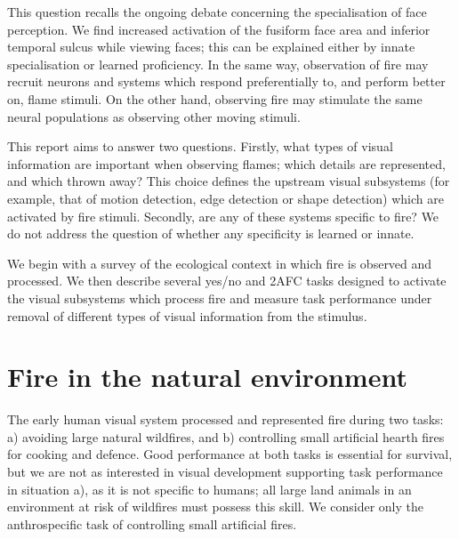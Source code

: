 \documentclass[a4paper]{article}
\begin{document}
This question recalls the ongoing debate concerning the specialisation of face perception. We find increased activation of the fusiform face area and inferior temporal sulcus while viewing faces\cite{allison2000social}; this can be explained either by innate specialisation or learned proficiency. In the same way, observation of fire may recruit neurons and systems which respond preferentially to, and perform better on, flame stimuli. On the other hand, observing fire may stimulate the same neural populations as observing other moving stimuli.

This report aims to answer two questions. Firstly, what types of visual information are important when observing flames; which details are represented, and which thrown away? This choice defines the upstream visual subsystems (for example, that of motion detection, edge detection or shape detection) which are activated by fire stimuli. Secondly, are any of these systems specific to fire? We do not address the question of whether any specificity is learned or innate.

We begin with a survey of the ecological context in which fire is observed and processed. We then describe several yes/no and 2AFC tasks designed to activate the visual subsystems which process fire and measure task performance under removal of different types of visual information from the stimulus.

\section{Fire in the natural environment}



%
%

The early human visual system processed and represented fire during two tasks: a) avoiding large natural wildfires, and b) controlling small artificial hearth fires for cooking and defence. Good performance at both tasks is essential for survival, but we are not as interested in visual development supporting task performance in situation a), as it is not specific to humans; all large land animals in an environment at risk of wildfires must possess this skill. We consider only the anthrospecific task of controlling small artificial fires.
\end{document}
